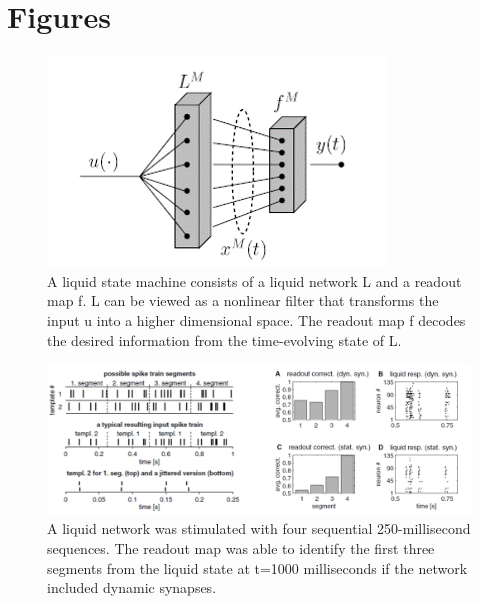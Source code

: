 \documentclass[a4paper,11pt]{article}
\begin{document}
\section{Figures}
\begin{figure}[p]
 \caption{A liquid state machine consists of a liquid network L and a readout map f. L can be viewed as a nonlinear filter that transforms the input u into a higher dimensional space. The readout map f decodes the desired information from the time-evolving state of L.\cite{maas2002}}
 \label{fig:lsm_structure}
 \centering
   \includegraphics[width=\textwidth]{fig/lsm}
\end{figure}

\begin{figure}[p]
 \caption{A liquid network was stimulated with four sequential 250-millisecond sequences. The readout map was able to identify the first three segments from the liquid state at t=1000 milliseconds if the network included dynamic synapses. \cite{maas2002}}
 \label{fig:lsm_memory}
 \centering
   \includegraphics[width=\textwidth]{fig/maas_memory}
\end{figure}
\end{document}
